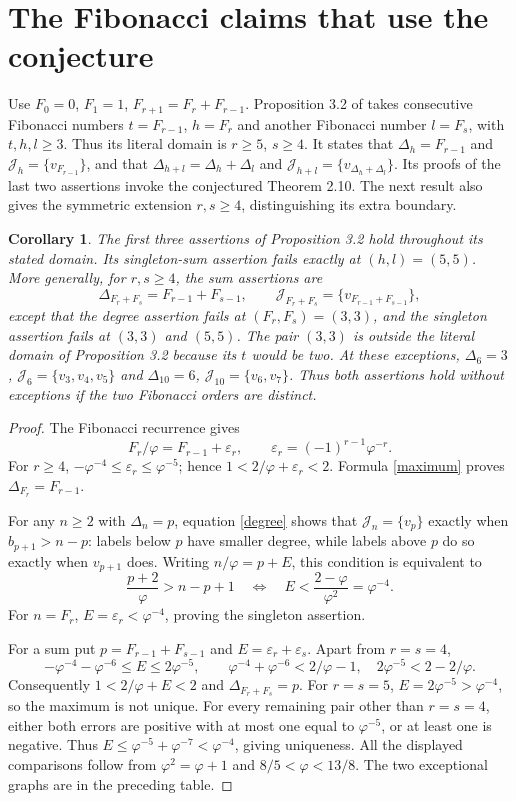 \documentclass[11pt]{article}
\newtheorem{corollary}[theorem]{Corollary}
\newcommand{\J}{\mathcal J}
\newcommand{\ph}{\varphi}
\begin{document}
\section{The Fibonacci claims that use the conjecture}
Use $F_0=0$, $F_1=1$, $F_{r+1}=F_r+F_{r-1}$. Proposition 3.2 of
\cite[pp.~10--11]{original} takes consecutive Fibonacci numbers
$t=F_{r-1}$, $h=F_r$ and another Fibonacci number $l=F_s$, with
$t,h,l\ge3$. Thus its literal domain is $r\ge5$, $s\ge4$.
It states that $\Delta_h=F_{r-1}$ and $\J_h=\{v_{F_{r-1}}\}$,
and that $\Delta_{h+l}=\Delta_h+\Delta_l$ and
$\J_{h+l}=\{v_{\Delta_h+\Delta_l}\}$. Its proofs of the last two
assertions invoke the conjectured Theorem 2.10. The next result also
gives the symmetric extension $r,s\ge4$, distinguishing its extra boundary.

\begin{corollary}\label{fib}
The first three assertions of Proposition 3.2 hold throughout its stated
domain. Its singleton-sum assertion fails exactly at $(h,l)=(5,5)$.
More generally, for $r,s\ge4$, the sum assertions are
\[
 \Delta_{F_r+F_s}=F_{r-1}+F_{s-1},\qquad
 \J_{F_r+F_s}=\{v_{F_{r-1}+F_{s-1}}\},
\]
except that the degree assertion fails at $(F_r,F_s)=(3,3)$, and the
singleton assertion fails at $(3,3)$ and $(5,5)$. The pair $(3,3)$ is
outside the literal domain of Proposition 3.2 because its $t$ would be two.
At these exceptions, $\Delta_6=3$, $\J_6=\{v_3,v_4,v_5\}$ and
$\Delta_{10}=6$, $\J_{10}=\{v_6,v_7\}$. Thus both assertions hold
without exceptions if the two Fibonacci orders are distinct.
\end{corollary}
\begin{proof}
The Fibonacci recurrence gives
\[
 F_r/\ph=F_{r-1}+\varepsilon_r,\qquad
 \varepsilon_r=(-1)^{r-1}\ph^{-r}.
\]
For $r\ge4$, $-\ph^{-4}\le\varepsilon_r\le\ph^{-5}$; hence
$1<2/\ph+\varepsilon_r<2$. Formula \eqref{maximum} proves
$\Delta_{F_r}=F_{r-1}$.

For any $n\ge2$ with $\Delta_n=p$, equation \eqref{degree} shows
that $\J_n=\{v_p\}$ exactly when $b_{p+1}>n-p$:
labels below $p$ have smaller degree, while labels above $p$ do so
exactly when $v_{p+1}$ does. Writing $n/\ph=p+E$, this condition is
equivalent to
\[
 \frac{p+2}{\ph}>n-p+1
 \quad\Longleftrightarrow\quad E<\frac{2-\ph}{\ph^2}=\ph^{-4}.
\]
For $n=F_r$, $E=\varepsilon_r<\ph^{-4}$, proving the singleton assertion.

For a sum put $p=F_{r-1}+F_{s-1}$ and $E=\varepsilon_r+\varepsilon_s$.
Apart from $r=s=4$,
\[
 -\ph^{-4}-\ph^{-6}\le E\le2\ph^{-5},\qquad
 \ph^{-4}+\ph^{-6}<2/\ph-1,\quad 2\ph^{-5}<2-2/\ph.
\]
Consequently $1<2/\ph+E<2$ and $\Delta_{F_r+F_s}=p$.
For $r=s=5$, $E=2\ph^{-5}>\ph^{-4}$, so the maximum is not unique.
For every remaining pair other than $r=s=4$, either both errors are
positive with at most one equal to $\ph^{-5}$, or at least one is
negative. Thus $E\le\ph^{-5}+\ph^{-7}<\ph^{-4}$, giving uniqueness.
All the displayed comparisons follow from $\ph^2=\ph+1$ and
$8/5<\ph<13/8$. The two exceptional graphs are in the preceding table.
\end{proof}
\end{document}
